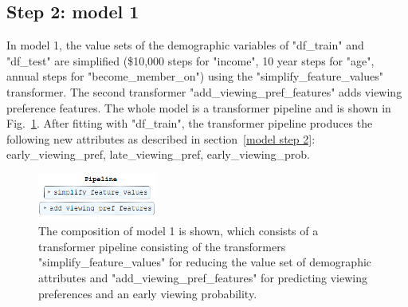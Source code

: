 \documentclass[11pt]{article} %
\begin{document}
\subsection{Step 2: model 1}
In model 1, the value sets of the demographic variables of "df\_train" and "df\_test" are simplified (\$10,000 steps for "income", 10 year steps for "age", annual steps for "become\_member\_on")
using the "simplify\_fea\-ture\_values" transformer.
The second transformer "add\_viewing\_pref\_features" adds viewing preference features.
The whole model is a transformer pipeline and is shown in Fig.~\ref{implementation step2.1}.
After fitting with "df\_train", the transformer pipeline produces the following new attributes as described in section~\ref{model step 2}: early\_viewing\_pref, late\_viewing\_pref, early\_viewing\_prob.

\begin{figure}[H]
\centering \includegraphics[width=0.35\textwidth]{pics/model1.png}
\caption{\label{implementation step2.1}The composition of model 1 is shown, which consists of a transformer pipeline consisting of the transformers "simplify\_feature\_values" for reducing the value set of demographic attributes and "add\_viewing\_pref\_features" for predicting viewing preferences and an early viewing probability.}
\end{figure}
\end{document}
